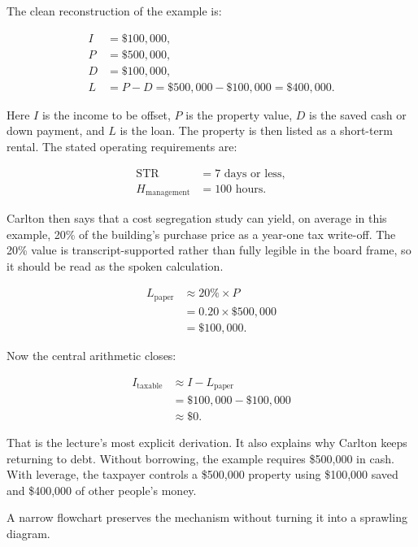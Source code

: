 The clean reconstruction of the example is:

\begin{align}
I &= \$100{,}000,\\
P &= \$500{,}000,\\
D &= \$100{,}000,\\
L &= P-D=\$500{,}000-\$100{,}000=\$400{,}000.
\end{align}

Here \(I\) is the income to be offset, \(P\) is the property value, \(D\) is the saved cash or down payment, and \(L\) is the loan. The property is then listed as a short-term rental. The stated operating requirements are:

\begin{align}
\mathrm{STR} &= 7\text{ days or less},\\
H_{\mathrm{management}} &= 100\text{ hours}.
\end{align}

Carlton then says that a cost segregation study can yield, on average in this example, 20\% of the building's purchase price as a year-one tax write-off. The 20\% value is transcript-supported rather than fully legible in the board frame, so it should be read as the spoken calculation.

\begin{align}
L_{\mathrm{paper}}
  &\approx 20\%\times P\\
  &=0.20\times \$500{,}000\\
  &=\$100{,}000.
\end{align}

Now the central arithmetic closes:

\begin{align}
I_{\mathrm{taxable}}
  &\approx I-L_{\mathrm{paper}}\\
  &=\$100{,}000-\$100{,}000\\
  &\approx \$0.
\end{align}

That is the lecture's most explicit derivation. It also explains why Carlton keeps returning to debt. Without borrowing, the example requires \$500,000 in cash. With leverage, the taxpayer controls a \$500,000 property using \$100,000 saved and \$400,000 of other people's money.

A narrow flowchart preserves the mechanism without turning it into a sprawling diagram.

